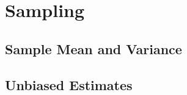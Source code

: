 \documentclass[../main]{subfiles}
\begin{document}
\section{Sampling}

\subsection{Sample Mean and Variance}

\subsection{Unbiased Estimates}
\end{document}
